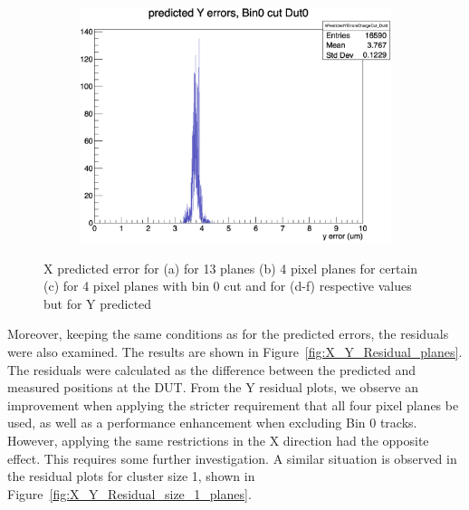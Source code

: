 \begin{figure}[H]
\begin{subfigure}[b]{0.3\textwidth}
        \includegraphics[width=\textwidth]{images/YPredError_4pixel_noBin0.png}
        \caption{}
    \end{subfigure}

    \caption{X predicted error for (a) for 13 planes (b) 4 pixel planes for certain (c) for 4 pixel planes with bin 0 cut and for (d-f) respective values but for Y predicted}
    \label{fig:X_Y_Predicted_Errors}
\end{figure}

Moreover, keeping the same conditions as for the predicted errors, the residuals were also examined. The results are shown in Figure~\ref{fig:X_Y_Residual_planes}. The residuals were calculated as the difference between the predicted and measured positions at the DUT. From the Y residual plots, we observe an improvement when applying the stricter requirement that all four pixel planes be used, as well as a performance enhancement when excluding Bin 0 tracks. However, applying the same restrictions in the X direction had the opposite effect. This requires some further investigation. A similar situation is observed in the residual plots for cluster size 1, shown in Figure~\ref{fig:X_Y_Residual_size_1_planes}.

